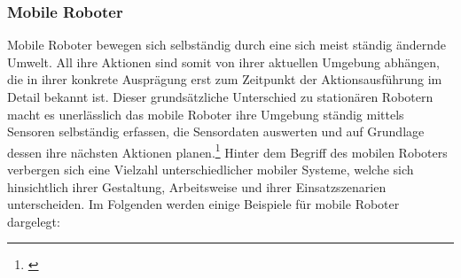 \subsubsection{Mobile Roboter}
Mobile Roboter bewegen sich selbständig durch eine sich meist ständig ändernde Umwelt. All ihre Aktionen sind somit von ihrer aktuellen Umgebung abhängen, die in ihrer konkrete Ausprägung erst zum Zeitpunkt der Aktionsausführung im Detail bekannt ist. 
\newline
Dieser grundsätzliche Unterschied zu stationären Robotern macht es unerlässlich das mobile Roboter ihre Umgebung ständig mittels Sensoren selbständig erfassen, die Sensordaten auswerten und auf Grundlage dessen ihre nächsten Aktionen planen.\footnote{\citep[vgl.][Mobile Roboter, Seite 2]{Hertzberg.MobileRoboter}\label{note3}}
\newline
Hinter dem Begriff des mobilen Roboters verbergen sich eine Vielzahl unterschiedlicher mobiler Systeme, welche
sich hinsichtlich ihrer Gestaltung, Arbeitsweise und ihrer Einsatzszenarien unterscheiden. Im Folgenden werden einige Beispiele für mobile Roboter dargelegt:
